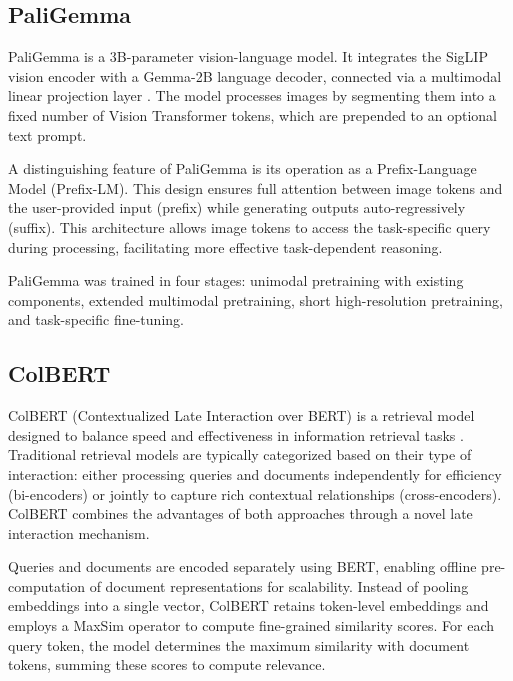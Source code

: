\documentclass{article} %
\begin{document}
\subsection*{PaliGemma}
\label{subsection:glossary_paligemma}

PaliGemma is a 3B-parameter vision-language model. It integrates the SigLIP vision encoder with a Gemma-2B language decoder, connected via a multimodal linear projection layer \citep{lucas_beyer_paligemma_2024}. The model processes images by segmenting them into a fixed number of Vision Transformer \citep{dosovitskiy_image_2020} tokens, which are prepended to an optional text prompt.

A distinguishing feature of PaliGemma is its operation as a Prefix-Language Model (Prefix-LM). This design ensures full attention between image tokens and the user-provided input (prefix) while generating outputs auto-regressively (suffix). This architecture allows image tokens to access the task-specific query during processing, facilitating more effective task-dependent reasoning.

PaliGemma was trained in four stages: unimodal pretraining with existing components, extended multimodal pretraining, short high-resolution pretraining, and task-specific fine-tuning.


\subsection*{ColBERT}
\label{subsection:glossary_colbert}

ColBERT (Contextualized Late Interaction over BERT) is a retrieval model designed to balance speed and effectiveness in information retrieval tasks \citep{khattab_colbert_2020}. Traditional retrieval models are typically categorized based on their type of interaction: either processing queries and documents independently for efficiency (bi-encoders) or jointly to capture rich contextual relationships (cross-encoders). ColBERT combines the advantages of both approaches through a novel late interaction mechanism.

Queries and documents are encoded separately using BERT, enabling offline pre-computation of document representations for scalability. Instead of pooling embeddings into a single vector, ColBERT retains token-level embeddings and employs a MaxSim operator to compute fine-grained similarity scores. For each query token, the model determines the maximum similarity with document tokens, summing these scores to compute relevance.
\end{document}
